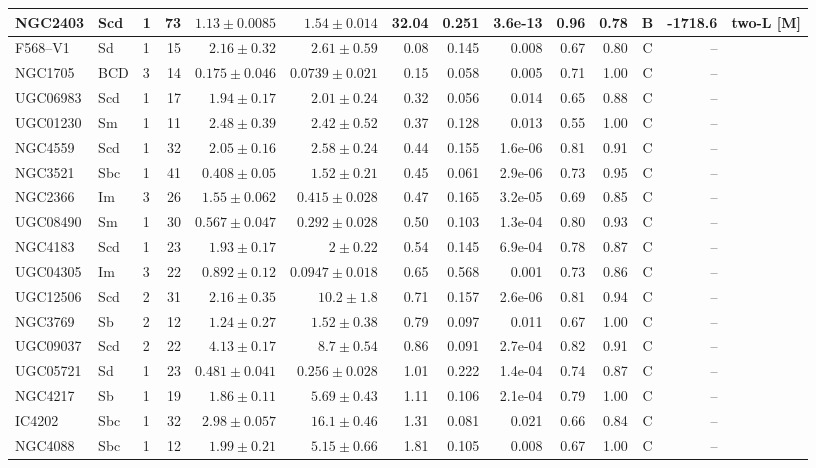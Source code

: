 \documentclass[9pt]{extarticle}
\begin{document}
{\begin{longtable}{lllrrrrrrrrcrl}
NGC2403 & Scd & 1 & 73 & $1.13\pm0.0085$ & $1.54\pm0.014$ & 32.04 & 0.251 & 3.6e-13 & 0.96 & 0.78 & B & -1718.6 & two-L [M]\\
\midrule
F568--V1 & Sd & 1 & 15 & $2.16\pm0.32$ & $2.61\pm0.59$ & 0.08 & 0.145 & 0.008 & 0.67 & 0.80 & C & -- & \\
NGC1705 & BCD & 3 & 14 & $0.175\pm0.046$ & $0.0739\pm0.021$ & 0.15 & 0.058 & 0.005 & 0.71 & 1.00 & C & -- & \\
UGC06983 & Scd & 1 & 17 & $1.94\pm0.17$ & $2.01\pm0.24$ & 0.32 & 0.056 & 0.014 & 0.65 & 0.88 & C & -- & \\
UGC01230 & Sm & 1 & 11 & $2.48\pm0.39$ & $2.42\pm0.52$ & 0.37 & 0.128 & 0.013 & 0.55 & 1.00 & C & -- & \\
NGC4559 & Scd & 1 & 32 & $2.05\pm0.16$ & $2.58\pm0.24$ & 0.44 & 0.155 & 1.6e-06 & 0.81 & 0.91 & C & -- & \\
NGC3521 & Sbc & 1 & 41 & $0.408\pm0.05$ & $1.52\pm0.21$ & 0.45 & 0.061 & 2.9e-06 & 0.73 & 0.95 & C & -- & \\
NGC2366 & Im & 3 & 26 & $1.55\pm0.062$ & $0.415\pm0.028$ & 0.47 & 0.165 & 3.2e-05 & 0.69 & 0.85 & C & -- & \\
UGC08490 & Sm & 1 & 30 & $0.567\pm0.047$ & $0.292\pm0.028$ & 0.50 & 0.103 & 1.3e-04 & 0.80 & 0.93 & C & -- & \\
NGC4183 & Scd & 1 & 23 & $1.93\pm0.17$ & $2\pm0.22$ & 0.54 & 0.145 & 6.9e-04 & 0.78 & 0.87 & C & -- & \\
UGC04305 & Im & 3 & 22 & $0.892\pm0.12$ & $0.0947\pm0.018$ & 0.65 & 0.568 & 0.001 & 0.73 & 0.86 & C & -- & \\
UGC12506 & Scd & 2 & 31 & $2.16\pm0.35$ & $10.2\pm1.8$ & 0.71 & 0.157 & 2.6e-06 & 0.81 & 0.94 & C & -- & \\
NGC3769 & Sb & 2 & 12 & $1.24\pm0.27$ & $1.52\pm0.38$ & 0.79 & 0.097 & 0.011 & 0.67 & 1.00 & C & -- & \\
UGC09037 & Scd & 2 & 22 & $4.13\pm0.17$ & $8.7\pm0.54$ & 0.86 & 0.091 & 2.7e-04 & 0.82 & 0.91 & C & -- & \\
UGC05721 & Sd & 1 & 23 & $0.481\pm0.041$ & $0.256\pm0.028$ & 1.01 & 0.222 & 1.4e-04 & 0.74 & 0.87 & C & -- & \\
NGC4217 & Sb & 1 & 19 & $1.86\pm0.11$ & $5.69\pm0.43$ & 1.11 & 0.106 & 2.1e-04 & 0.79 & 1.00 & C & -- & \\
IC4202 & Sbc & 1 & 32 & $2.98\pm0.057$ & $16.1\pm0.46$ & 1.31 & 0.081 & 0.021 & 0.66 & 0.84 & C & -- & \\
NGC4088 & Sbc & 1 & 12 & $1.99\pm0.21$ & $5.15\pm0.66$ & 1.81 & 0.105 & 0.008 & 0.67 & 1.00 & C & -- & \\

\end{longtable}}
\end{document}
